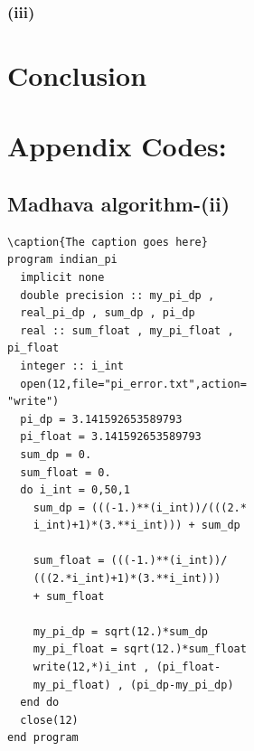 \documentclass[twocolumn]{article}
\begin{document}
										
\subsubsection{(iii)}													
\section{Conclusion} 												
\section{Appendix Codes:}
\subsection{Madhava algorithm-(ii)}\label{[Madhava algorithm]}
\begin{verbatim}\caption{The caption goes here}
program indian_pi
  implicit none
  double precision :: my_pi_dp , 
  real_pi_dp , sum_dp , pi_dp
  real :: sum_float , my_pi_float , 
pi_float
  integer :: i_int
  open(12,file="pi_error.txt",action=
"write")
  pi_dp = 3.141592653589793
  pi_float = 3.141592653589793
  sum_dp = 0.
  sum_float = 0.
  do i_int = 0,50,1
    sum_dp = (((-1.)**(i_int))/(((2.*
    i_int)+1)*(3.**i_int))) + sum_dp

    sum_float = (((-1.)**(i_int))/
    (((2.*i_int)+1)*(3.**i_int))) 
    + sum_float

    my_pi_dp = sqrt(12.)*sum_dp
    my_pi_float = sqrt(12.)*sum_float
    write(12,*)i_int , (pi_float-
    my_pi_float) , (pi_dp-my_pi_dp)
  end do
  close(12)
end program
\end{verbatim}

\end{document}
